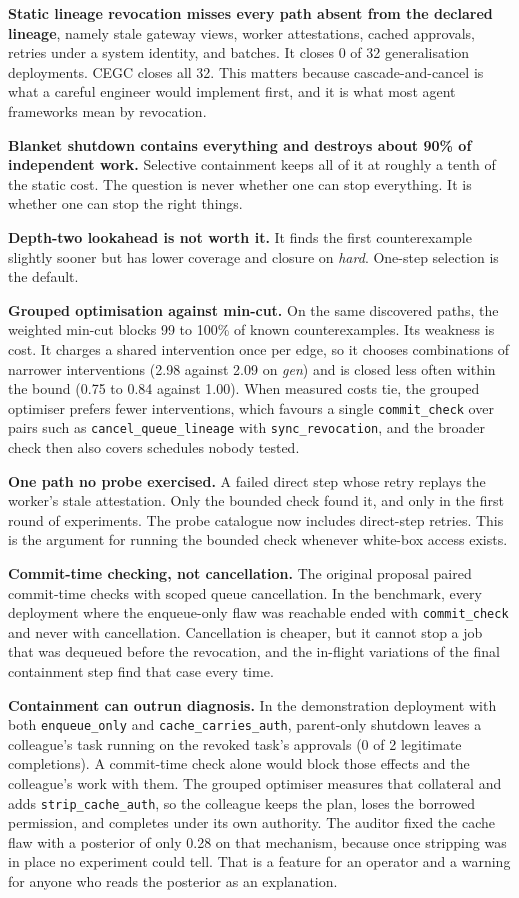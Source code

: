\documentclass[10pt]{article}
\begin{document}
\textbf{Static lineage revocation misses every path absent from the declared lineage}, namely stale gateway views, worker attestations, cached approvals, retries under a system identity, and batches. It closes 0 of 32 generalisation deployments. CEGC closes all 32. This matters because cascade-and-cancel is what a careful engineer would implement first, and it is what most agent frameworks mean by revocation.

\textbf{Blanket shutdown contains everything and destroys about 90\% of independent work.} Selective containment keeps all of it at roughly a tenth of the static cost. The question is never whether one can stop everything. It is whether one can stop the right things.

\textbf{Depth-two lookahead is not worth it.} It finds the first counterexample slightly sooner but has lower coverage and closure on \emph{hard}. One-step selection is the default.

\textbf{Grouped optimisation against min-cut.} On the same discovered paths, the weighted min-cut blocks 99 to 100\% of known counterexamples. Its weakness is cost. It charges a shared intervention once per edge, so it chooses combinations of narrower interventions (2.98 against 2.09 on \emph{gen}) and is closed less often within the bound (0.75 to 0.84 against 1.00). When measured costs tie, the grouped optimiser prefers fewer interventions, which favours a single \texttt{commit\_check} over pairs such as \texttt{cancel\_queue\_lineage} with \texttt{sync\_revocation}, and the broader check then also covers schedules nobody tested.

\textbf{One path no probe exercised.} A failed direct step whose retry replays the worker's stale attestation. Only the bounded check found it, and only in the first round of experiments. The probe catalogue now includes direct-step retries. This is the argument for running the bounded check whenever white-box access exists.

\textbf{Commit-time checking, not cancellation.} The original proposal paired commit-time checks with scoped queue cancellation. In the benchmark, every deployment where the enqueue-only flaw was reachable ended with \texttt{commit\_check} and never with cancellation. Cancellation is cheaper, but it cannot stop a job that was dequeued before the revocation, and the in-flight variations of the final containment step find that case every time.

\textbf{Containment can outrun diagnosis.} In the demonstration deployment with both \texttt{enqueue\_only} and \texttt{cache\_carries\_auth}, parent-only shutdown leaves a colleague's task running on the revoked task's approvals (0 of 2 legitimate completions). A commit-time check alone would block those effects and the colleague's work with them. The grouped optimiser measures that collateral and adds \texttt{strip\_cache\_auth}, so the colleague keeps the plan, loses the borrowed permission, and completes under its own authority. The auditor fixed the cache flaw with a posterior of only 0.28 on that mechanism, because once stripping was in place no experiment could tell. That is a feature for an operator and a warning for anyone who reads the posterior as an explanation.
\end{document}
